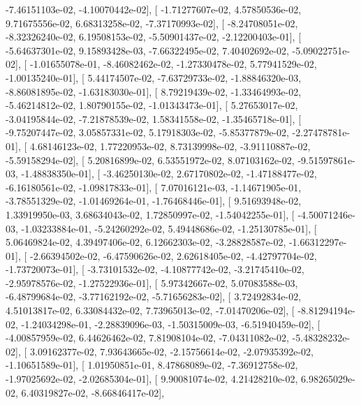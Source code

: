 \documentclass{article}
\begin{document}
         -7.46151103e-02,  -4.10070442e-02],
       [ -1.71277607e-02,   4.57850536e-02,   9.71675556e-02,
          6.68313258e-02,  -7.37170993e-02],
       [ -8.24708051e-02,  -8.32326240e-02,   6.19508153e-02,
         -5.50901437e-02,  -2.12200403e-01],
       [ -5.64637301e-02,   9.15893428e-03,  -7.66322495e-02,
          7.40402692e-02,  -5.09022751e-02],
       [ -1.01655078e-01,  -8.46082462e-02,  -1.27330478e-02,
          5.77941529e-02,  -1.00135240e-01],
       [  5.44174507e-02,  -7.63729733e-02,  -1.88846320e-03,
         -8.86081895e-02,  -1.63183030e-01],
       [  8.79219439e-02,  -1.33464993e-02,  -5.46214812e-02,
          1.80790155e-02,  -1.01343473e-01],
       [  5.27653017e-02,  -3.04195844e-02,  -7.21878539e-02,
          1.58341558e-02,  -1.35465718e-01],
       [ -9.75207447e-02,   3.05857331e-02,   5.17918303e-02,
         -5.85377879e-02,  -2.27478781e-01],
       [  4.68146123e-02,   1.77220953e-02,   8.73139998e-02,
         -3.91110887e-02,  -5.59158294e-02],
       [  5.20816899e-02,   6.53551972e-02,   8.07103162e-02,
         -9.51597861e-03,  -1.48838350e-01],
       [ -3.46250130e-02,   2.67170802e-02,  -1.47188477e-02,
         -6.16180561e-02,  -1.09817833e-01],
       [  7.07016121e-03,  -1.14671905e-01,  -3.78551329e-02,
         -1.01469264e-01,  -1.76468446e-01],
       [  9.51693948e-02,   1.33919950e-03,   3.68634043e-02,
          1.72850997e-02,  -1.54042255e-01],
       [ -4.50071246e-03,  -1.03233884e-01,  -5.24260292e-02,
          5.49448686e-02,  -1.25130785e-01],
       [  5.06469824e-02,   4.39497406e-02,   6.12662303e-02,
         -3.28828587e-02,  -1.66312297e-01],
       [ -2.66394502e-02,  -6.47590626e-02,   2.62618405e-02,
         -4.42797704e-02,  -1.73720073e-01],
       [ -3.73101532e-02,  -4.10877742e-02,  -3.21745410e-02,
         -2.95978576e-02,  -1.27522936e-01],
       [  5.97342667e-02,   5.07083588e-03,  -6.48799684e-02,
         -3.77162192e-02,  -5.71656283e-02],
       [  3.72492834e-02,   4.51013817e-02,   6.33084432e-02,
          7.73965013e-02,  -7.01470206e-02],
       [ -8.81294194e-02,  -1.24034298e-01,  -2.28839096e-03,
         -1.50315009e-03,  -6.51940459e-02],
       [ -4.00857959e-02,   6.44626462e-02,   7.81908104e-02,
         -7.04311082e-02,  -5.48328232e-02],
       [  3.09162377e-02,   7.93643665e-02,  -2.15756614e-02,
         -2.07935392e-02,  -1.10651589e-01],
       [  1.01950851e-01,   8.47868089e-02,  -7.36912758e-02,
         -1.97025692e-02,  -2.02685304e-01],
       [  9.90081074e-02,   4.21428210e-02,   6.98265029e-02,
          6.40319827e-02,  -8.66846417e-02],
\end{document}
